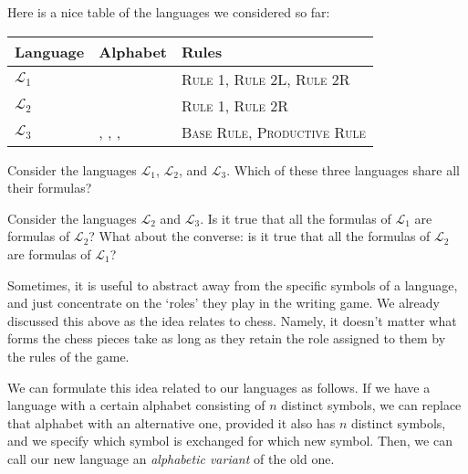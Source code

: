 Here is a nice table of the languages we considered so far: 

\begin{center}
\begin{tabular}{lll}
	\textbf{Language} & \textbf{Alphabet} & \textbf{Rules} \\\hline
	$\mathcal{L}_1$ & \bcirc & \textsc{Rule 1}, \textsc{Rule 2L}, \textsc{Rule 2R}\\
	$\mathcal{L}_2$ & \bcirc & \textsc{Rule 1}, \textsc{Rule 2R}\\
	$\mathcal{L}_3$ & \bcirc, \bbox, \btri, \bstar & \textsc{Base Rule}, \textsc{Productive Rule}
\end{tabular}
\end{center}


\begin{exc}
Consider the languages $\mathcal{L}_1$, $\mathcal{L}_2$, and $\mathcal{L}_3$. Which of these three languages share all their formulas? 
\end{exc}

\begin{exc}
Consider the languages $\mathcal{L}_2$ and $\mathcal{L}_3$. Is it true that all the formulas of $\mathcal{L}_1$ are formulas of $\mathcal{L}_2$? What about the converse: is it true that all the formulas of $\mathcal{L}_2$ are formulas of $\mathcal{L}_1$?
\end{exc}

Sometimes, it is useful to abstract away from the specific symbols of a language, and just concentrate on the `roles' they play in the writing game. We already discussed this above as the idea relates to chess. Namely, it doesn't matter what forms the chess pieces take as long as they retain the role assigned to them by the rules of the game. 

We can formulate this idea related to our languages as follows. If we have a language with a certain alphabet consisting of $n$ distinct symbols, we can replace that alphabet with an alternative one, provided it also has $n$ distinct symbols, and we specify which symbol is exchanged for which new symbol. Then, we can call our new language an \textit{alphabetic variant} of the old one. \label{alphvar}

